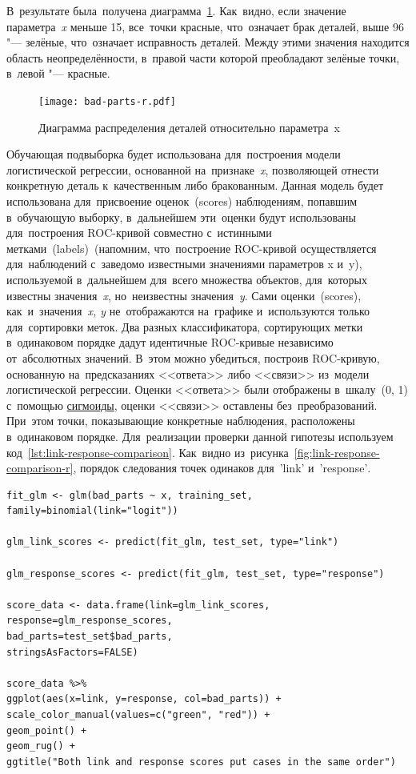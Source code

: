 \documentclass[]{scrreprt}
\begin{document}
В~результате была~получена диаграмма~\ref{fig:bad-parts-r}. Как~видно, если значение параметра~\emph{x} меньше 15, все~точки красные, что~означает брак деталей, выше 96 "--- зелёные, что~означает исправность деталей. Между этими значения находится область неопределённости, в~правой части которой преобладают зелёные точки, в~левой "--- красные.
%
\begin{figure}[ht]
	\centering
	\texttt{[image: bad-parts-r.pdf]}
	\caption{Диаграмма распределения деталей относительно параметра~x}
	\label{fig:bad-parts-r}
\end{figure}
%

Обучающая подвыборка будет использована для~построения модели логистической регрессии, основанной на~признаке~\emph{x}, позволяющей отнести конкретную деталь к~качественным либо бракованным. Данная модель будет использована для~присвоение оценок~(\foreignlanguage{english}{scores}) наблюдениям, попавшим в~обучающую выборку, в~дальнейшем эти~оценки будут использованы для~построения ROC-кривой совместно с~истинными метками~(\foreignlanguage{english}{labels})~(напомним, что~построение ROC-кривой осуществляется для~наблюдений с~заведомо известными значениями параметров x и~y), используемой в~дальнейшем для~всего множества объектов, для~которых известны значения~\emph{x}, но~неизвестны значения~\emph{y}. Сами оценки~(\foreignlanguage{english}{scores}), как~и~значения~\emph{x, y} не~отображаются на~графике и~используются только для~сортировки меток. Два разных классификатора, сортирующих метки в~одинаковом порядке дадут идентичные ROC-кривые независимо от~абсолютных значений. В~этом можно убедиться, построив ROC-кривую, основанную на~предсказаниях <<ответа>> либо <<связи>> из~модели логистической регрессии. Оценки <<ответа>> были отображены в~шкалу~(0, 1) с~помощью \href{https://en.wikipedia.org/wiki/Sigmoid_function}{сигмоиды}\cite{Wiki:sigmoid-function}, оценки <<связи>> оставлены без~преобразований. При~этом точки, показывающие конкретные наблюдения, расположены в~одинаковом порядке. Для~реализации проверки данной гипотезы используем код~\ref{lst:link-response-comparison}. Как~видно из~рисунка~\ref{fig:link-response-comparison-r}, порядок следования точек одинаков для~\foreignlanguage{english}{'link'} и~\foreignlanguage{english}{'response'}.
%
\begin{lstlisting}[float, caption = Сравнение предсказаний типов 'link' и~'response', firstnumber=1, label= lst:link-response-comparison]
fit_glm <- glm(bad_parts ~ x, training_set, family=binomial(link="logit"))

glm_link_scores <- predict(fit_glm, test_set, type="link")

glm_response_scores <- predict(fit_glm, test_set, type="response")

score_data <- data.frame(link=glm_link_scores, 
response=glm_response_scores,
bad_parts=test_set$bad_parts,
stringsAsFactors=FALSE)

score_data %>% 
ggplot(aes(x=link, y=response, col=bad_parts)) + 
scale_color_manual(values=c("green", "red")) + 
geom_point() + 
geom_rug() + 
ggtitle("Both link and response scores put cases in the same order")

\end{lstlisting}
\end{document}
